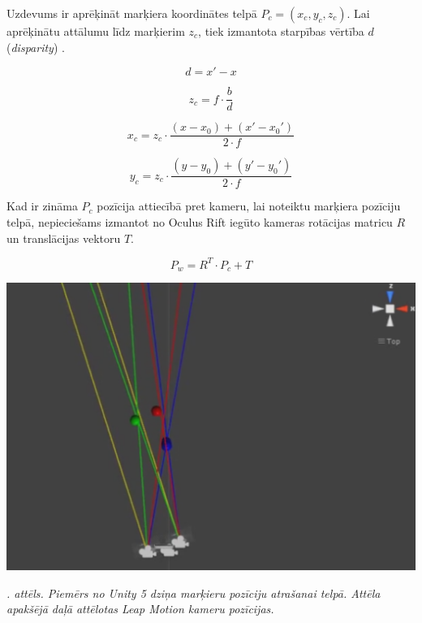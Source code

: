 \documentclass[12pt, a4paper, oneside, openright]{article}
\renewcommand{\thecimages}{\arabic{cimages}}
\begin{document}
Uzdevums ir aprēķināt marķiera koordinātes telpā $P_c = (x_c, y_c, z_c)$.
Lai aprēķinātu attālumu līdz marķierim $z_c$, tiek izmantota starpības vērtība $d$ (\textit{disparity}) \cite{AndersonA.S.Souza2012}.

\begin{equation}
d = x' - x
\end{equation}

\begin{equation}
z_c = f \cdot \frac{b}{d}
\end{equation}

\begin{equation}
x_c = z_c \cdot \frac{(x - x_0) + (x' - x_0')}{2 \cdot f}
\end{equation}

\begin{equation}
y_c = z_c \cdot \frac{(y - y_0) + (y' - y_0')}{2 \cdot f}
\end{equation}

Kad ir zināma $P_c$ pozīcija attiecībā pret kameru, lai noteiktu marķiera pozīciju telpā,
nepieciešams izmantot no Oculus Rift iegūto kameras rotācijas matricu $R$ un translācijas vektoru $T$.

\begin{equation}
P_w = R^T \cdot P_c + T
\end{equation}


\label{cimages:online_sample.png}
\vspace{10pt}
\begin{samepage}
\begin{center}
\includegraphics[width=0.5\columnwidth]{images/online_sample.png}
\begin{center}
\footnotesize{
\textit{\thecimages. attēls. Piemērs no Unity 5 dziņa marķieru pozīciju atrašanai telpā. Attēla apakšējā daļā attēlotas Leap Motion kameru pozīcijas.}}
\end{center}
\end{center}
\end{samepage}
\end{document}

